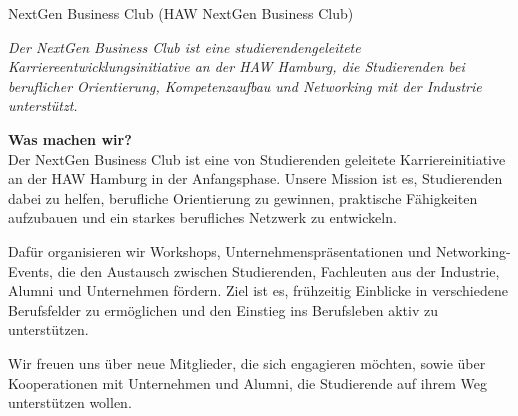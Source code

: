 




\begin{initiativkarte}{NextGen Business Club (HAW NextGen Business Club)}   %



  \textit{\textcolor{hawgray}{Der NextGen Business Club ist eine studierendengeleitete Karriereentwicklungsinitiative an der HAW Hamburg, die Studierenden bei beruflicher Orientierung, Kompetenzaufbau und Networking mit der Industrie unterstützt.}}



  \vspace{0.5cm}

  \hawrule




  \textbf{\textcolor{hawblue}{Was machen wir?}}\\[0.3cm]

  Der NextGen Business Club ist eine von Studierenden geleitete Karriereinitiative an der HAW Hamburg in der Anfangsphase. Unsere Mission ist es, Studierenden dabei zu helfen, berufliche Orientierung zu gewinnen, praktische Fähigkeiten aufzubauen und ein starkes berufliches Netzwerk zu entwickeln.\\

  \vspace{0.2cm}

  Dafür organisieren wir Workshops, Unternehmenspräsentationen und Networking-Events, die den Austausch zwischen Studierenden, Fachleuten aus der Industrie, Alumni und Unternehmen fördern. Ziel ist es, frühzeitig Einblicke in verschiedene Berufsfelder zu ermöglichen und den Einstieg ins Berufsleben aktiv zu unterstützen.\\

  \vspace{0.2cm}

  Wir freuen uns über neue Mitglieder, die sich engagieren möchten, sowie über Kooperationen mit Unternehmen und Alumni, die Studierende auf ihrem Weg unterstützen wollen.



  \vspace{0.5cm}




\end{initiativkarte}
